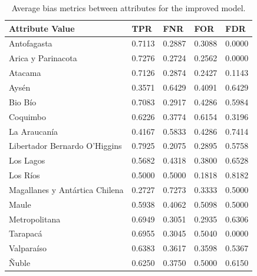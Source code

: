 \documentclass[twoside,11pt]{article}
\begin{document}
\begin{table}[ht]
\centering
\begin{tabular}{|p{3.5cm}|p{1cm}|p{1cm}|p{1cm}|p{1cm}|}
\hline

    \textbf{Attribute Value} &      \textbf{TPR} &      \textbf{FNR} &    \textbf{FOR} &    \textbf{FDR} \\ \hline

                   Antofagasta &   0.7113 &   0.2887 & 0.3088 & 0.0000 \\
            Arica y Parinacota &   0.7276 &   0.2724 & 0.2562 & 0.0000 \\
                       Atacama &   0.7126 &   0.2874 & 0.2427 & 0.1143 \\
                         Aysén &   0.3571 &   0.6429 & 0.4091 & 0.6429 \\
                       Bio Bío &   0.7083 &   0.2917 & 0.4286 & 0.5984 \\
                      Coquimbo &   0.6226 &   0.3774 & 0.6154 & 0.3196 \\
                  La Araucanía &   0.4167 &   0.5833 & 0.4286 & 0.7414 \\
 Libertador Bernardo O'Higgins &   0.7925 &   0.2075 & 0.2895 & 0.5758 \\
                     Los Lagos &   0.5682 &   0.4318 & 0.3800 & 0.6528 \\
                      Los Ríos &   0.5000 &   0.5000 & 0.1818 & 0.8182 \\
Magallanes y Antártica Chilena &   0.2727 &   0.7273 & 0.3333 & 0.5000 \\
                         Maule &   0.5938 &   0.4062 & 0.5098 & 0.5000 \\
                 Metropolitana &   0.6949 &   0.3051 & 0.2935 & 0.6306 \\
                      Tarapacá &   0.6955 &   0.3045 & 0.5040 & 0.0000 \\
                    Valparaíso &   0.6383 &   0.3617 & 0.3598 & 0.5367 \\
                         Ñuble &   0.6250 & 0.3750 & 0.5000 & 0.6150 \\

\hline
\end{tabular}
\caption{Average bias metrics between attributes for the improved model.}
\label{tab_region_tdrogas_opt:}
\end{table}

\end{document}

